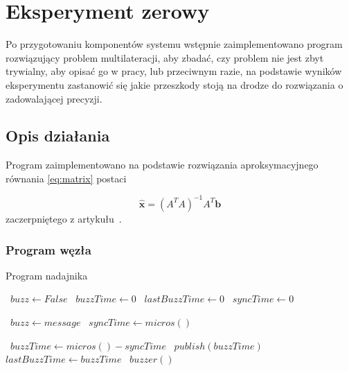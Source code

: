 \chapter{Eksperyment zerowy}

Po przygotowaniu komponentów systemu wstępnie zaimplementowano program rozwiązujący problem multilateracji, aby zbadać, czy problem nie jest zbyt trywialny, aby opisać go w pracy, lub przeciwnym razie, na podstawie wyników eksperymentu zastanowić się jakie przeszkody stoją na drodze do rozwiązania o zadowalającej precyzji.

\section{Opis działania}

Program zaimplementowano na podstawie rozwiązania aproksymacyjnego równania \ref{eq:matrix} postaci

\begin{equation}
    \hat{\boldsymbol{x}} = {\left(A^T A\right)}^{-1} A^T \boldsymbol{b}
\end{equation}
zaczerpniętego z artykułu~\cite{norrdine2012algebraic}.

\subsection{Program węzła}

\begin{algorithm}
\caption{Program nadajnika}\label{alg:source}
\begin{algorithmic}[1]
    \State\ $buzz \gets False$
    \State\ $buzzTime \gets 0$
    \State\ $lastBuzzTime \gets 0$
    \State\ $syncTime \gets 0$

            \State\ $buzz \gets message$
        \EndIf
            \State\ $syncTime \gets micros()$
        \EndIf
    \EndFunction

    \Loop
            \State\ $buzzTime \gets micros() - syncTime$
            \State\ $publish(buzzTime)$
            \State\ $lastBuzzTime \gets buzzTime$
            \State\ $buzzer()$
        \EndIf
    \EndLoop
\end{algorithmic}
\end{algorithm}

